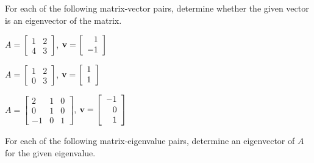 \label{sec:eigen_exer}

\be
\item For each of the following matrix-vector pairs, determine whether the given vector is an eigenvector of the matrix.

\ba
\item $A=\left[ \begin{array}{cc} 1&2 \\ 4&3 \end{array} \right]$, $\mathbf{v}=\left[ \begin{array}{r} 1\\-1 \end{array} \right]$

\item $A=\left[ \begin{array}{cc} 1&2 \\ 0&3 \end{array} \right]$, $\mathbf{v}=\left[ \begin{array}{r} 1\\1 \end{array} \right]$


\item $A=\left[ \begin{array}{rcc} 2&1&0 \\ 0&1&0 \\ -1&0&1 \end{array} \right]$, $\mathbf{v}=\left[ \begin{array}{r} -1\\0\\1 \end{array} \right]$

\ea

\item For each of the following matrix-eigenvalue pairs, determine an eigenvector of $A$ for the given eigenvalue. \\

